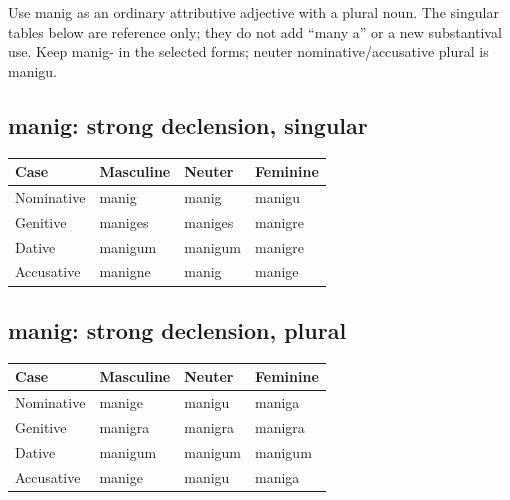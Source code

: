 Use manig as an ordinary attributive adjective with a plural noun. The singular tables below are reference only; they do not add “many a” or a new substantival use. Keep manig- in the selected forms; neuter nominative/\allowbreak{}accusative plural is manigu.

\subsection*{manig: strong declension, singular}

\par\begingroup
\fontsize{10.5}{13.2}\selectfont
\setlength{\LTleft}{0pt}\setlength{\LTright}{\fill}
\noindent
\begin{tabular}{@{}>{\raggedright\arraybackslash}p{28.89mm}>{\raggedright\arraybackslash}p{28.89mm}>{\raggedright\arraybackslash}p{28.89mm}>{\raggedright\arraybackslash}p{28.89mm}@{}}
\toprule
\textbf{Case} & \textbf{Masculine} & \textbf{Neuter} & \textbf{Feminine} \\
\midrule
Nominative & manig & manig & manigu \\
Genitive & maniges & maniges & manigre \\
Dative & manigum & manigum & manigre \\
Accusative & manigne & manig & manige \\
\bottomrule
\end{tabular}
\par\endgroup

\subsection*{manig: strong declension, plural}

\par\begingroup
\fontsize{10.5}{13.2}\selectfont
\setlength{\LTleft}{0pt}\setlength{\LTright}{\fill}
\noindent
\begin{tabular}{@{}>{\raggedright\arraybackslash}p{28.89mm}>{\raggedright\arraybackslash}p{28.89mm}>{\raggedright\arraybackslash}p{28.89mm}>{\raggedright\arraybackslash}p{28.89mm}@{}}
\toprule
\textbf{Case} & \textbf{Masculine} & \textbf{Neuter} & \textbf{Feminine} \\
\midrule
Nominative & manige & manigu & maniga \\
Genitive & manigra & manigra & manigra \\
Dative & manigum & manigum & manigum \\
Accusative & manige & manigu & maniga \\
\bottomrule
\end{tabular}
\par\endgroup

